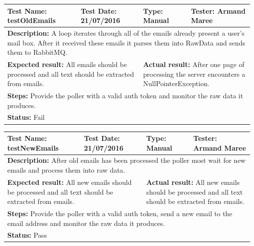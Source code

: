 \documentclass[hidelinks,english]{article}
\begin{document}
				\begin{center}
					\begin{tabular}{p{4cm} p{4cm} p{4cm} p{4cm}}
					\hline
					\multicolumn{1}{L{4cm}}{\textbf{Test Name:} testOldEmails} & \multicolumn{1}{L{4cm}}{\textbf{Test Date:} 21/07/2016} & \multicolumn{1}{L{4cm}}{\textbf{Type:} Manual} & \multicolumn{1}{L{4cm}}{\textbf{Tester:} Armand Maree} \\ \hline \hline
					\multicolumn{4}{L{16cm}}{\textbf{Description:} A loop iterates through all of the emails already present a user's mail box. After it received these emails it parses them into RawData and sends them to RabbitMQ.} \\
					\multicolumn{2}{L{8cm}}{\textbf{Expected result:} All emails should be processed and all text should be extracted from emails.} & \multicolumn{2}{L{8cm}}{\textbf{Actual result:} After one page of processing the server encounters a NullPointerException.} \\ \multicolumn{4}{L{16cm}}{\textbf{Steps:} Provide the poller with a valid auth token and monitor the raw data it produces.} \\
					\multicolumn{4}{L{16cm}}{\textbf{Status:} Fail}\\ \hline
					\end{tabular}
				\end{center}
				
			\begin{center}
				\begin{tabular}{p{4cm} p{4cm} p{4cm} p{4cm}}
				\hline
				\multicolumn{1}{L{4cm}}{\textbf{Test Name:} testNewEmails} & \multicolumn{1}{L{4cm}}{\textbf{Test Date:} 21/07/2016} & \multicolumn{1}{L{4cm}}{\textbf{Type:} Manual} & \multicolumn{1}{L{4cm}}{\textbf{Tester:} Armand Maree} \\ \hline \hline
				\multicolumn{4}{L{16cm}}{\textbf{Description:} After old emails has been processed the poller most wait for new emails and process them into raw data.} \\
				\multicolumn{2}{L{8cm}}{\textbf{Expected result:} All new emails should be processed and all text should be extracted from emails.} & \multicolumn{2}{L{8cm}}{\textbf{Actual result:} All new emails should be processed and all text should be extracted from emails.} \\ \multicolumn{4}{L{16cm}}{\textbf{Steps:} Provide the poller with a valid auth token, send a new email to the email address and monitor the raw data it produces.} \\
				\multicolumn{4}{L{16cm}}{\textbf{Status:} Pass}\\ \hline
				\end{tabular}
			\end{center}
			
\end{document}
